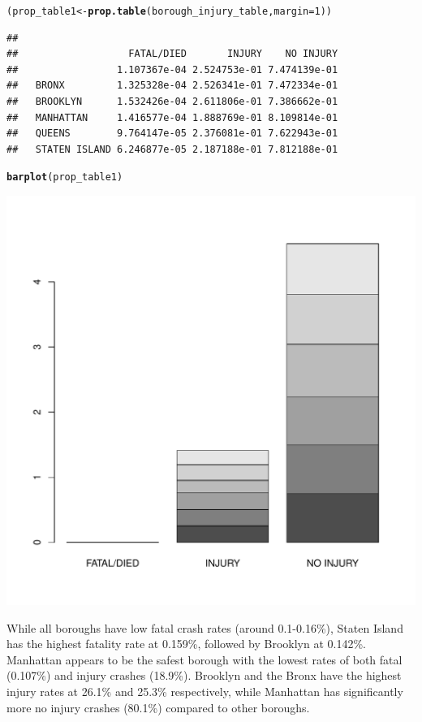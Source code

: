 \documentclass[10pt]{article}\usepackage[]{graphicx}\usepackage[]{xcolor}
\makeatletter
\def\maxwidth{ %
  \ifdim\Gin@nat@width>\linewidth
    \linewidth
  \else
    \Gin@nat@width
  \fi
}
\newcommand{\hlnum}[1]{\textcolor[rgb]{0.686,0.059,0.569}{#1}}%
\newcommand{\hldef}[1]{\textcolor[rgb]{0.345,0.345,0.345}{#1}}%
\newcommand{\hlkwb}[1]{\textcolor[rgb]{0.69,0.353,0.396}{#1}}%
\newcommand{\hlkwc}[1]{\textcolor[rgb]{0.333,0.667,0.333}{#1}}%
\newcommand{\hlkwd}[1]{\textcolor[rgb]{0.737,0.353,0.396}{\textbf{#1}}}%
\newenvironment{kframe}{%
 \def\at@end@of@kframe{}%
 \ifinner\ifhmode%
  \def\at@end@of@kframe{\end{minipage}}%
  \begin{minipage}{\columnwidth}%
 \fi\fi%
 \def\FrameCommand##1{\hskip\@totalleftmargin \hskip-\fboxsep
 \colorbox{shadecolor}{##1}\hskip-\fboxsep
     \hskip-\linewidth \hskip-\@totalleftmargin \hskip\columnwidth}%
 \MakeFramed {\advance\hsize-\width
   \@totalleftmargin\z@ \linewidth\hsize
   \@setminipage}}%
 {\par\unskip\endMakeFramed%
 \at@end@of@kframe}
\newenvironment{knitrout}{}{} %
\makeatother
\begin{document}
\begin{knitrout}
\color{fgcolor}\begin{kframe}
\begin{alltt}
\hldef{(prop_table1} \hlkwb{<-} \hlkwd{prop.table}\hldef{(borough_injury_table,} \hlkwc{margin} \hldef{=} \hlnum{1}\hldef{))}
\end{alltt}
\begin{verbatim}
##                
##                   FATAL/DIED       INJURY    NO INJURY
##                 1.107367e-04 2.524753e-01 7.474139e-01
##   BRONX         1.325328e-04 2.526341e-01 7.472334e-01
##   BROOKLYN      1.532426e-04 2.611806e-01 7.386662e-01
##   MANHATTAN     1.416577e-04 1.888769e-01 8.109814e-01
##   QUEENS        9.764147e-05 2.376081e-01 7.622943e-01
##   STATEN ISLAND 6.246877e-05 2.187188e-01 7.812188e-01
\end{verbatim}
\begin{alltt}
\hlkwd{barplot}\hldef{(prop_table1)}
\end{alltt}
\end{kframe}
\includegraphics[width=\maxwidth]{figure/unnamed-chunk-9-1} 
\end{knitrout}

While all boroughs have low fatal crash rates (around 0.1-0.16\%), Staten Island has the highest fatality rate at 0.159\%, followed by Brooklyn at 0.142\%. Manhattan appears to be the safest borough with the lowest rates of both fatal (0.107\%) and injury crashes (18.9\%). Brooklyn and the Bronx have the highest injury rates at 26.1\% and 25.3\% respectively, while Manhattan has significantly more no injury crashes (80.1\%) compared to other boroughs.
\end{document}
